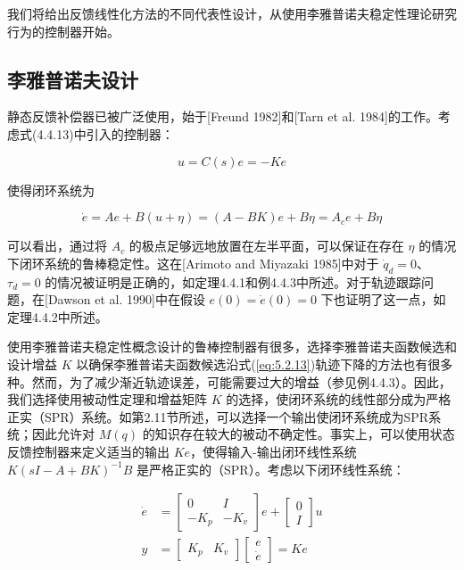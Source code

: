\documentclass[UTF8,12pt,a4paper]{ctexart}
\begin{document}
我们将给出反馈线性化方法的不同代表性设计，从使用李雅普诺夫稳定性理论研究行为的控制器开始。

\subsection{李雅普诺夫设计}

静态反馈补偿器已被广泛使用，始于[Freund 1982]和[Tarn et al. 1984]的工作。考虑式(4.4.13)中引入的控制器：

\begin{equation}\label{eq:5.2.12}
u = C(s)e = -Ke
\end{equation}

使得闭环系统为

\begin{equation}\label{eq:5.2.13}
\dot{e} = Ae + B(u + \eta) = (A - BK)e + B\eta = A_c e + B\eta
\end{equation}

可以看出，通过将 $A_c$ 的极点足够远地放置在左半平面，可以保证在存在 $\eta$ 的情况下闭环系统的鲁棒稳定性。这在[Arimoto and Miyazaki 1985]中对于 $\dot{q}_d = 0$、$\tau_d = 0$ 的情况被证明是正确的，如定理4.4.1和例4.4.3中所述。对于轨迹跟踪问题，在[Dawson et al. 1990]中在假设 $e(0) = \dot{e}(0) = 0$ 下也证明了这一点，如定理4.4.2中所述。

使用李雅普诺夫稳定性概念设计的鲁棒控制器有很多，选择李雅普诺夫函数候选和设计增益 $K$ 以确保李雅普诺夫函数候选沿式(\ref{eq:5.2.13})轨迹下降的方法也有很多种。然而，为了减少渐近轨迹误差，可能需要过大的增益（参见例4.4.3）。因此，我们选择使用被动性定理和增益矩阵 $K$ 的选择，使闭环系统的线性部分成为严格正实（SPR）系统。如第2.11节所述，可以选择一个输出使闭环系统成为SPR系统；因此允许对 $M(q)$ 的知识存在较大的被动不确定性。事实上，可以使用状态反馈控制器来定义适当的输出 $Ke$，使得输入-输出闭环线性系统 $K(sI - A + BK)^{-1}B$ 是严格正实的（SPR）。考虑以下闭环线性系统：

\begin{align}
\dot{e} &= \begin{bmatrix} 0 & I \\ -K_p & -K_v \end{bmatrix} e + \begin{bmatrix} 0 \\ I \end{bmatrix} u \label{eq:5.2.14} \\
y &= \begin{bmatrix} K_p & K_v \end{bmatrix} \begin{bmatrix} e \\ \dot{e} \end{bmatrix} = Ke
\end{align}
\end{document}
